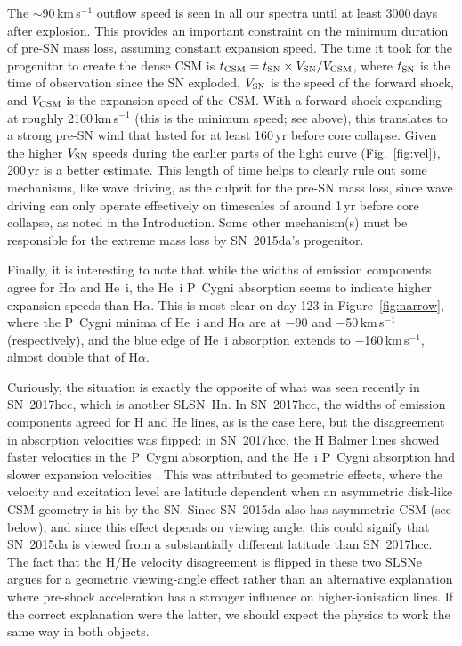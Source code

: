\documentclass[fleqn,usenatbib,useAMS]{mnras}
\begin{document}
The $\sim$90\,km\,s$^{-1}$ outflow speed is seen in all our spectra until
at least 3000\,days after explosion.  This provides an important
constraint on the minimum duration of pre-SN mass loss, assuming
constant expansion speed.  The time it took for the progenitor to
create the dense CSM is $t_{\rm CSM} = t_{\rm SN} \times V_{\rm SN}
/ V_{\rm CSM}$, where $t_{\rm SN}$ is the time of observation since
the SN exploded, $V_{\rm SN}$ is the speed of the forward shock, and 
$V_{\rm CSM}$ is the expansion speed of the CSM.  With a forward shock
expanding at roughly 2100\,km\,s$^{-1}$ (this is the minimum speed; see
above), this translates to a strong pre-SN wind that lasted for at
least 160\,yr before core collapse.  Given the higher $V_{\rm SN}$ speeds during
the earlier parts of the light curve (Fig.~\ref{fig:vel}), 200\,yr is a better
estimate.  This length of time helps to clearly rule out some
mechanisms, like wave driving, as the culprit for the pre-SN mass
loss, since wave driving can only operate effectively on timescales of
around 1\,yr before core collapse, as noted in the Introduction.  Some
other mechanism(s) must be responsible for the extreme mass loss by
SN~2015da's progenitor. 

Finally, it is interesting to note that while the widths of emission
components agree for H$\alpha$ and He~{\sc i}, the He~{\sc i} P~Cygni
absorption seems to indicate higher expansion speeds than H$\alpha$.
This is most clear on day 123 in Figure~\ref{fig:narrow}, where the P~Cygni minima of He~{\sc i} and H$\alpha$ are at $-$90 and $-$50\,km\,s$^{-1}$ (respectively), and the blue edge of He~{\sc i} absorption extends
to $-$160\,km\,s$^{-1}$, almost double that of H$\alpha$.

Curiously, the situation is exactly the opposite of what was seen
recently in SN~2017hcc, which is another SLSN~IIn.  In SN~2017hcc, the
widths of emission components agreed for H and He lines, as is the
case here, but the disagreement in absorption velocities was flipped:
in SN~2017hcc, the H Balmer lines showed faster
velocities in the P~Cygni absorption, and 
the He~{\sc i} P~Cygni absorption had slower expansion velocities \citep{smith20}.  This was
attributed to geometric effects, where the velocity and excitation
level are latitude dependent when an asymmetric disk-like CSM geometry
is hit by the SN.  Since SN~2015da also has asymmetric CSM (see
below), and since this effect depends on viewing angle, this could
signify that SN~2015da is viewed from a substantially different
latitude than SN~2017hcc.  The fact that the H/He velocity
disagreement is flipped in these two SLSNe argues for a geometric
viewing-angle effect rather than an alternative explanation where
pre-shock acceleration has a stronger influence on higher-ionisation
lines.  If the correct explanation were the latter, we should expect
the physics to work the same way in both objects.
\end{document}
